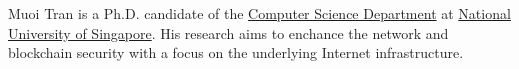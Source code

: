 








\begin{cvparagraph}

Muoi Tran is a Ph.D. candidate of the \href{http://www.comp.nus.edu.sg/about/depts/cs/}{Computer Science Department} at \href{http://nus.edu.sg/}{National University of Singapore}. 
His research aims to enchance the network and blockchain security with a focus on the underlying Internet infrastructure.





\end{cvparagraph}
